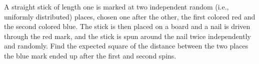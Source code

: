 \begin{problem}
  A straight stick of length one is marked at two independent random (i.e.,
  uniformly distributed) places, chosen one after the other, the first
  colored red and the second colored blue. The stick is then placed on a
  board and a nail is driven through the red mark, and the stick is spun
  around the nail twice independently and randomly. Find the expected
  square of the distance between the two places the blue mark ended up
  after the first and second spins.
\end{problem}
\begin{solution*}
\end{solution*}


